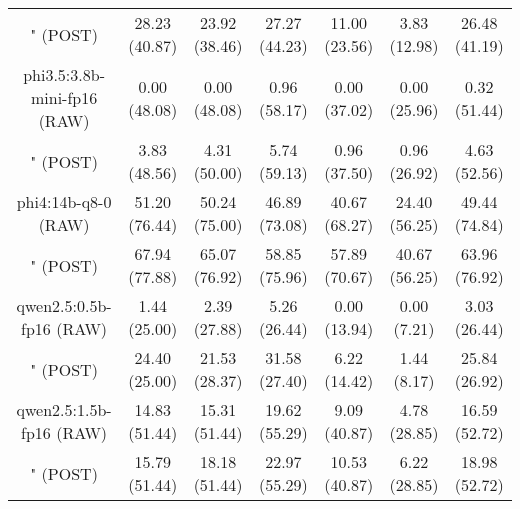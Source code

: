 \begin{table}[]
{\begin{tabular}{ccccccc}
        

        \multicolumn{1}{c|}{" (POST)} & 28.23 (40.87) & 23.92 (38.46) & \multicolumn{1}{c|}{27.27 (44.23)} & 11.00 (23.56) & \multicolumn{1}{c|}{3.83 (12.98)} & 26.48 (41.19) \\
        \cline{1-7}
        

        \multicolumn{1}{c|}{phi3.5:3.8b-mini-fp16 (RAW)} & 0.00 (48.08) & 0.00 (48.08) & \multicolumn{1}{c|}{0.96 (58.17)} & 0.00 (37.02) & \multicolumn{1}{c|}{0.00 (25.96)} & 0.32 (51.44) \\
        
        

        \multicolumn{1}{c|}{" (POST)} & 3.83 (48.56) & 4.31 (50.00) & \multicolumn{1}{c|}{5.74 (59.13)} & 0.96 (37.50) & \multicolumn{1}{c|}{0.96 (26.92)} & 4.63 (52.56) \\
        \cline{1-7}
        

        \multicolumn{1}{c|}{phi4:14b-q8-0 (RAW)} & 51.20 (76.44) & 50.24 (75.00) & \multicolumn{1}{c|}{46.89 (73.08)} & 40.67 (68.27) & \multicolumn{1}{c|}{24.40 (56.25)} & 49.44 (74.84) \\
        
        

        \multicolumn{1}{c|}{" (POST)} & 67.94 (77.88) & 65.07 (76.92) & \multicolumn{1}{c|}{58.85 (75.96)} & 57.89 (70.67) & \multicolumn{1}{c|}{40.67 (56.25)} & 63.96 (76.92) \\
        \cline{1-7}
        

        \multicolumn{1}{c|}{qwen2.5:0.5b-fp16 (RAW)} & 1.44 (25.00) & 2.39 (27.88) & \multicolumn{1}{c|}{5.26 (26.44)} & 0.00 (13.94) & \multicolumn{1}{c|}{0.00 (7.21)} & 3.03 (26.44) \\
        
        

        \multicolumn{1}{c|}{" (POST)} & 24.40 (25.00) & 21.53 (28.37) & \multicolumn{1}{c|}{31.58 (27.40)} & 6.22 (14.42) & \multicolumn{1}{c|}{1.44 (8.17)} & 25.84 (26.92) \\
        \cline{1-7}
        

        \multicolumn{1}{c|}{qwen2.5:1.5b-fp16 (RAW)} & 14.83 (51.44) & 15.31 (51.44) & \multicolumn{1}{c|}{19.62 (55.29)} & 9.09 (40.87) & \multicolumn{1}{c|}{4.78 (28.85)} & 16.59 (52.72) \\
        
        

        \multicolumn{1}{c|}{" (POST)} & 15.79 (51.44) & 18.18 (51.44) & \multicolumn{1}{c|}{22.97 (55.29)} & 10.53 (40.87) & \multicolumn{1}{c|}{6.22 (28.85)} & 18.98 (52.72) \\
        \cline{1-7}
        


\end{tabular}}
\end{table}

